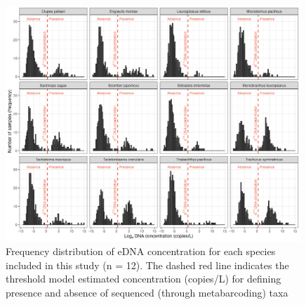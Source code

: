 \documentclass{article}
\begin{document}


\begin{figure}
\centering
\includegraphics[width=0.99\textwidth]{plots/6_Supplementary_Figure_2.jpg}
\caption{Frequency distribution of eDNA concentration for each species included in this study (n = 12). The dashed red line indicates the threshold model estimated concentration (copies/L) for defining presence and absence of sequenced (through metabarcoding) taxa}
\label{fig:presence_threshold}
\end{figure}
\end{document}
